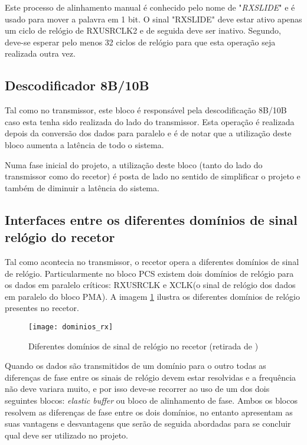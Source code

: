 Este processo de alinhamento manual é conhecido pelo nome de "\textit{RXSLIDE}" e é usado para mover a palavra em 1 bit. O sinal "RXSLIDE" deve estar ativo apenas um ciclo de relógio de RXUSRCLK2 e de seguida deve ser inativo. Segundo, \cite{R011} deve-se esperar pelo menos 32 ciclos de relógio para que esta operação seja realizada outra vez.  

\subsection{Descodificador 8B/10B}

Tal como no transmissor, este bloco é responsável pela descodificação 8B/10B caso esta tenha sido realizada do lado do transmissor. Esta operação é realizada depois da conversão dos dados para paralelo e é de notar que a utilização deste bloco aumenta a latência de todo o sistema.

Numa fase inicial do projeto, a utilização deste bloco (tanto do lado do transmissor como do recetor) é posta de lado no sentido de simplificar o projeto e também de diminuir a latência do sistema.   

\subsection{Interfaces entre os diferentes domínios de sinal relógio do recetor} \label{subsub:rx_buffer}

Tal como acontecia no transmissor, o recetor opera a diferentes domínios de sinal de relógio. Particularmente no bloco PCS existem dois domínios de relógio para os dados em paralelo críticos: RXUSRCLK e XCLK(o sinal de relógio dos dados em paralelo do bloco PMA). A imagem \ref{fig:dominios_rx} ilustra os diferentes domínios de relógio presentes no recetor.


\begin{figure}[h!]
	\begin{center}
		\leavevmode
		\texttt{[image: dominios\_rx]}
		\captionsetup{width=1.0\linewidth}
		\caption[Diferentes domínios de sinal de relógio no recetor]{Diferentes domínios de sinal de relógio no recetor (retirada de \cite{R011})}
		\label{fig:dominios_rx}
	\end{center}
\end{figure}

Quando os dados são transmitidos de um domínio para o outro todas as diferenças de fase entre os sinais de relógio devem estar resolvidas e a frequência não deve variara muito, e por isso deve-se recorrer ao uso de um dos dois seguintes blocos: \textit{elastic buffer} ou bloco de alinhamento de fase. Ambos os blocos resolvem as diferenças de fase entre os dois domínios, no entanto apresentam as suas vantagens e desvantagens que serão de seguida abordadas para se concluir qual deve ser utilizado no projeto.

